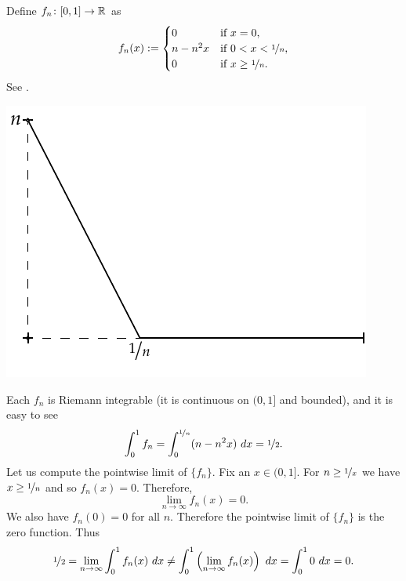 \begin{example}
Define $f_n \colon [0,1] \to {\mathbb{R}}$ as
\begin{equation*}
f_n(x) :=
\begin{cases}
0 &  \text{if } x = 0,\\
n-n^2x &  \text{if } 0 < x < \nicefrac{1}{n},\\
0 &  \text{if } x \geq \nicefrac{1}{n}.
\end{cases}
\end{equation*}
See .

\begin{myfigureht}
\includegraphics{figures/intconvcntr}
\caption{Graph of $f_n(x)$.%
\label{intconvcntr:fig}}
\end{myfigureht}

Each $f_n$ is Riemann integrable (it is continuous on $(0,1]$ and bounded),
and it is easy to see
\begin{equation*}
\int_0^1 f_n =
\int_0^{\nicefrac{1}{n}} (n-n^2x)~dx = \nicefrac{1}{2} .
\end{equation*}
Let us compute the pointwise limit of $\{ f_n \}$.
Fix an $x \in (0,1]$.  For $n \geq \nicefrac{1}{x}$
we have $x \geq \nicefrac{1}{n}$ and so $f_n(x) = 0$.  Therefore,
\begin{equation*}
\lim_{n \to \infty} f_n(x) = 0.
\end{equation*}
We also have $f_n(0) = 0$ for all $n$.  Therefore the pointwise
limit of $\{ f_n \}$ is the zero function.  Thus
\begin{equation*}
\nicefrac{1}{2} =
\lim_{n\to\infty}
\int_0^1 f_n (x)~dx
\not=
\int_0^1
\left(
\lim_{n\to\infty}
f_n(x)\right)~dx
=
\int_0^1 0~dx = 0 .
\end{equation*}
\end{example}


